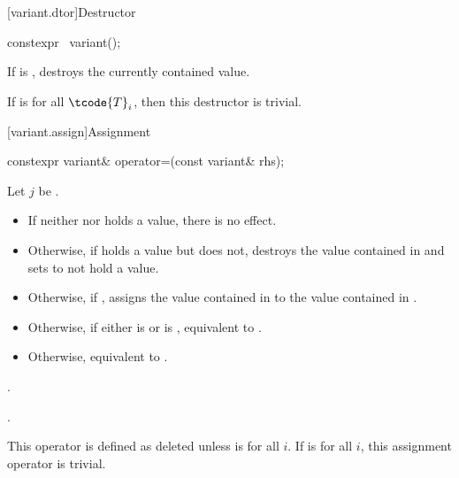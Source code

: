 [variant.dtor]{Destructor}

%
\begin{itemdecl}
constexpr ~variant();
\end{itemdecl}

\begin{itemdescr}
\pnum
\effects
If  is ,
destroys the currently contained value.

\pnum
\remarks
If  is  for all $\tcode{T}_i$,
then this destructor is trivial.
\end{itemdescr}

[variant.assign]{Assignment}

%
\begin{itemdecl}
constexpr variant& operator=(const variant& rhs);
\end{itemdecl}

\begin{itemdescr}
\pnum
Let $j$ be .

\pnum
\effects
\begin{itemize}
\item
If neither  nor  holds a value, there is no effect.
\item
Otherwise, if  holds a value but  does not, destroys the value
contained in  and sets  to not hold a value.
\item
Otherwise, if , assigns the value contained in 
to the value contained in .
\item
Otherwise, if either 
is  or
 is ,
equivalent to .
\item
Otherwise, equivalent to .
\end{itemize}

\pnum
\ensures
{}.

\pnum
\returns
{}.

\pnum
\remarks
This operator is defined as deleted unless
is  for all $i$.
If 
is  for all $i$, this assignment operator is trivial.
\end{itemdescr}

